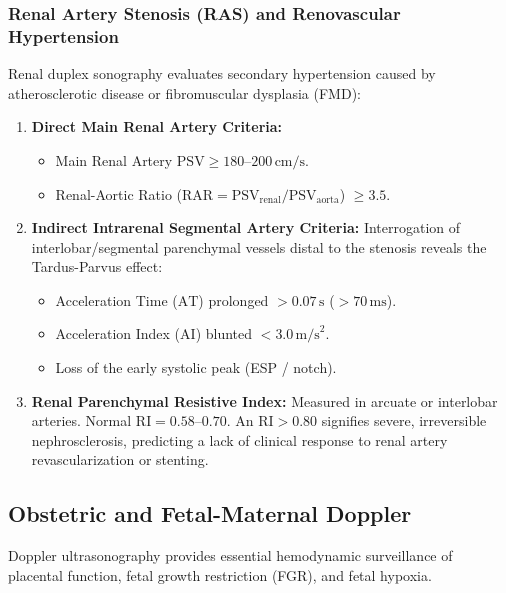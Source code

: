 \documentclass[11pt,a4paper]{article}
\begin{document}
\subsubsection{Renal Artery Stenosis (RAS) and Renovascular Hypertension}
Renal duplex sonography evaluates secondary hypertension caused by atherosclerotic disease or fibromuscular dysplasia (FMD):
\begin{enumerate}[leftmargin=*]
    \item \textbf{Direct Main Renal Artery Criteria:}
    \begin{itemize}
        \item Main Renal Artery $\text{PSV} \ge 180\text{--}200\,\text{cm/s}$.
        \item Renal-Aortic Ratio ($\text{RAR} = \text{PSV}_{\text{renal}} / \text{PSV}_{\text{aorta}}$) $\ge 3.5$.
    \end{itemize}
    \item \textbf{Indirect Intrarenal Segmental Artery Criteria:} Interrogation of interlobar/segmental parenchymal vessels distal to the stenosis reveals the Tardus-Parvus effect:
    \begin{itemize}
        \item Acceleration Time ($\text{AT}$) prolonged $> 0.07\,\text{s}$ ($> 70\,\text{ms}$).
        \item Acceleration Index ($\text{AI}$) blunted $< 3.0\,\text{m/s}^2$.
        \item Loss of the early systolic peak (ESP / notch).
    \end{itemize}
    \item \textbf{Renal Parenchymal Resistive Index:} Measured in arcuate or interlobar arteries. Normal $\text{RI} = 0.58\text{--}0.70$. An $\text{RI} > 0.80$ signifies severe, irreversible nephrosclerosis, predicting a lack of clinical response to renal artery revascularization or stenting.
\end{enumerate}

\subsection{Obstetric and Fetal-Maternal Doppler}

Doppler ultrasonography provides essential hemodynamic surveillance of placental function, fetal growth restriction (FGR), and fetal hypoxia.
\end{document}
